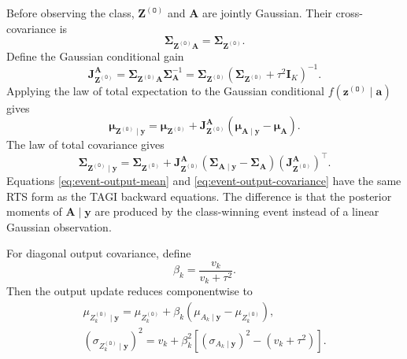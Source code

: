 \documentclass[11pt]{article}
\newcommand{\trans}{\intercal}
\newcommand{\Olayer}{\mathtt{O}}
\begin{document}
Before observing the class, $\bm Z^{(\Olayer)}$ and $\bm A$ are jointly
Gaussian.  Their cross-covariance is
\begin{equation}
 \bm\Sigma_{\bm Z^{(\Olayer)}\bm A}
 =
 \bm\Sigma_{\bm Z^{(\Olayer)}}.
\end{equation}
Define the Gaussian conditional gain
\begin{equation}
 \boxed{
 \mathbf J_{\bm Z^{(\Olayer)}}^{\bm A}
 =
 \bm\Sigma_{\bm Z^{(\Olayer)}\bm A}
 \bm\Sigma_{\bm A}^{-1}
 =
 \bm\Sigma_{\bm Z^{(\Olayer)}}
 \left(
 \bm\Sigma_{\bm Z^{(\Olayer)}}+\tau^2\mathbf I_K
 \right)^{-1}.}
 \label{eq:z-a-gain}
\end{equation}
Applying the law of total expectation to the Gaussian conditional
$f(\bm z^{(\Olayer)}\mid\bm a)$ gives
\begin{equation}
 \boxed{
 \bm\mu_{\bm Z^{(\Olayer)}\mid\bm y}
 =
 \bm\mu_{\bm Z^{(\Olayer)}}
 +
 \mathbf J_{\bm Z^{(\Olayer)}}^{\bm A}
 \left(
 \bm\mu_{\bm A\mid\bm y}-\bm\mu_{\bm A}
 \right).}
 \label{eq:event-output-mean}
\end{equation}
The law of total covariance gives
\begin{equation}
 \boxed{
 \bm\Sigma_{\bm Z^{(\Olayer)}\mid\bm y}
 =
 \bm\Sigma_{\bm Z^{(\Olayer)}}
 +
 \mathbf J_{\bm Z^{(\Olayer)}}^{\bm A}
 \left(
 \bm\Sigma_{\bm A\mid\bm y}-\bm\Sigma_{\bm A}
 \right)
 \left(\mathbf J_{\bm Z^{(\Olayer)}}^{\bm A}\right)^\trans.}
 \label{eq:event-output-covariance}
\end{equation}
Equations \eqref{eq:event-output-mean} and
\eqref{eq:event-output-covariance} have the same RTS form as the TAGI
backward equations.  The difference is that the posterior moments of
$\bm A\mid\bm y$ are produced by the class-winning event instead of a linear
Gaussian observation.

For diagonal output covariance, define
\begin{equation}
 \beta_k
 =
 \frac{v_k}{v_k+\tau^2}.
\end{equation}
Then the output update reduces componentwise to
\begin{align}
 \boxed{
 \mu_{Z_k^{(\Olayer)}\mid\bm y}
 =
 \mu_{Z_k^{(\Olayer)}}
 +
 \beta_k
 \left(
 \mu_{A_k\mid\bm y}-\mu_{Z_k^{(\Olayer)}}
 \right),}
 \label{eq:diagonal-output-mean}
 \\
 \boxed{
 (\sigma_{Z_k^{(\Olayer)}\mid\bm y})^2
 =
 v_k
 +
 \beta_k^2
 \left[
 (\sigma_{A_k\mid\bm y})^2-(v_k+\tau^2)
 \right].}
 \label{eq:diagonal-output-variance}
\end{align}
\end{document}
